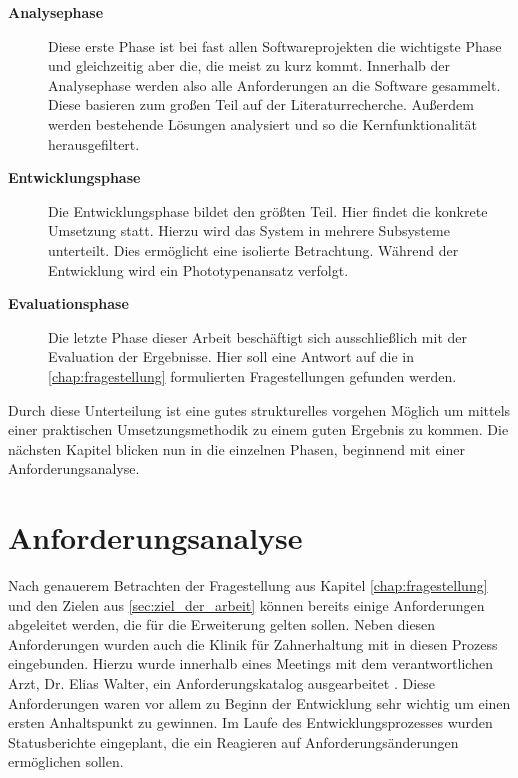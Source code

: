 \begin{description}
	\item[\textbf{Analysephase}] Diese erste Phase ist bei fast allen Softwareprojekten
		die wichtigste Phase und gleichzeitig aber die, die meist zu kurz kommt. Innerhalb
		der Analysephase werden also alle Anforderungen an die Software gesammelt.
		Diese basieren zum großen Teil auf der Literaturrecherche. Außerdem werden bestehende
		Lösungen analysiert und so die Kernfunktionalität herausgefiltert.

	\item[\textbf{Entwicklungsphase}] Die Entwicklungsphase bildet den größten Teil.
		Hier findet die konkrete Umsetzung statt. Hierzu wird das System in mehrere Subsysteme
		unterteilt. Dies ermöglicht eine isolierte Betrachtung. Während der Entwicklung
		wird ein Phototypenansatz verfolgt.

	\item[\textbf{Evaluationsphase}] Die letzte Phase dieser Arbeit beschäftigt sich
		ausschließlich mit der Evaluation der Ergebnisse. Hier soll eine Antwort auf
		die in \ref{chap:fragestellung} formulierten Fragestellungen gefunden werden.
\end{description}

Durch diese Unterteilung ist eine gutes strukturelles vorgehen Möglich um mittels
einer praktischen Umsetzungsmethodik zu einem guten Ergebnis zu kommen. Die
nächsten Kapitel blicken nun in die einzelnen Phasen, beginnend mit einer Anforderungsanalyse.

\section{Anforderungsanalyse}
\label{sec:anforderungsanalyse} Nach genauerem Betrachten der Fragestellung aus Kapitel
\ref{chap:fragestellung} und den Zielen aus \ref{sec:ziel_der_arbeit} können bereits
einige Anforderungen abgeleitet werden, die für die Erweiterung gelten sollen. Neben
diesen Anforderungen wurden auch die Klinik für Zahnerhaltung mit in diesen Prozess
eingebunden. Hierzu wurde innerhalb eines Meetings mit dem verantwortlichen Arzt,
Dr. Elias Walter, ein Anforderungskatalog ausgearbeitet \citep[vgl.][]{walter2025}.
Diese Anforderungen waren vor allem zu Beginn der Entwicklung sehr wichtig um einen
ersten Anhaltspunkt zu gewinnen. Im Laufe des Entwicklungsprozesses wurden
Statusberichte eingeplant, die ein Reagieren auf Anforderungsänderungen ermöglichen
sollen.

